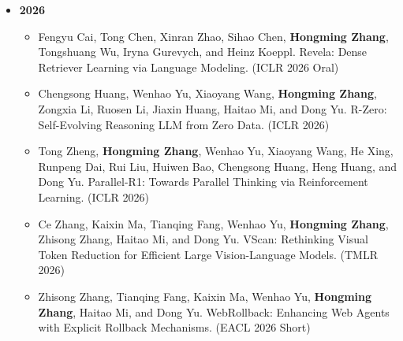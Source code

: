 


\begingroup
\small
\setlength{\parindent}{0pt}
\begin{itemize}[leftmargin=*, itemsep=0.35em, topsep=0.2em]
  \item[] \textbf{2026}
  \begin{itemize}[leftmargin=1.5em, itemsep=0.2em, topsep=0.1em]
    \item Fengyu Cai, Tong Chen, Xinran Zhao, Sihao Chen, \textbf{Hongming Zhang}, Tongshuang Wu, Iryna Gurevych, and Heinz Koeppl. Revela: Dense Retriever Learning via Language Modeling. (ICLR 2026 Oral)
    \item Chengsong Huang, Wenhao Yu, Xiaoyang Wang, \textbf{Hongming Zhang}, Zongxia Li, Ruosen Li, Jiaxin Huang, Haitao Mi, and Dong Yu. R-Zero: Self-Evolving Reasoning LLM from Zero Data. (ICLR 2026)
    \item Tong Zheng, \textbf{Hongming Zhang}, Wenhao Yu, Xiaoyang Wang, He Xing, Runpeng Dai, Rui Liu, Huiwen Bao, Chengsong Huang, Heng Huang, and Dong Yu. Parallel-R1: Towards Parallel Thinking via Reinforcement Learning. (ICLR 2026)
    \item Ce Zhang, Kaixin Ma, Tianqing Fang, Wenhao Yu, \textbf{Hongming Zhang}, Zhisong Zhang, Haitao Mi, and Dong Yu. VScan: Rethinking Visual Token Reduction for Efficient Large Vision-Language Models. (TMLR 2026)
    \item Zhisong Zhang, Tianqing Fang, Kaixin Ma, Wenhao Yu, \textbf{Hongming Zhang}, Haitao Mi, and Dong Yu. WebRollback: Enhancing Web Agents with Explicit Rollback Mechanisms. (EACL 2026 Short)
  \end{itemize}


\end{itemize}
